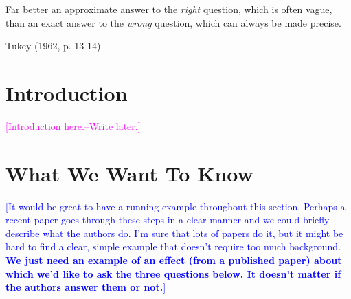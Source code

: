 \documentclass[12pt]{article}
\newcommand{\kelly}[1]{\textcolor{blue}{#1}}
\newcommand{\carlisle}[1]{\textcolor{magenta}{#1}}
\begin{document}
\epigraph{Far better an approximate answer to the \textit{right} question, which is often vague, than an exact answer to the \textit{wrong} question, which can always be made precise.}{Tukey (1962, p. 13-14)}


\newpage
\doublespace

\section*{Introduction}

\carlisle{[Introduction here.--Write later.]}

\section*{What We Want To Know}

\kelly{[It would be great to have a running example throughout this section. Perhaps a recent paper goes through these steps in a clear manner and we could briefly describe what the authors do. I'm sure that lots of papers do it, but it might be hard to find a clear, simple example that doesn't require too much background. \textbf{We just need an example of an effect (from a published paper) about which we'd like to ask the three questions below. It doesn't matter if the authors answer them or not.}]}
\end{document}

